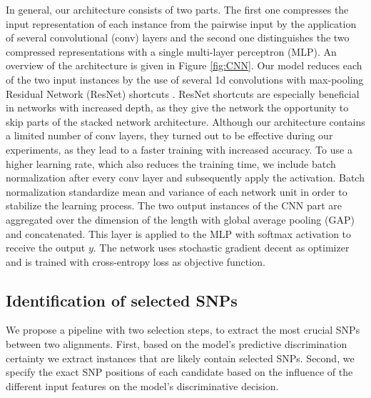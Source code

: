 \documentclass{article}
\begin{document}
In general, our architecture consists of two parts. The first one compresses the input representation of each instance from the pairwise input by the application of several convolutional (conv) layers and the second one distinguishes the two compressed representations with a single multi-layer perceptron (MLP). An overview of the architecture is given in Figure \ref{fig:CNN}.
Our model reduces each of the two input instances by the use of several 1d convolutions with max-pooling Residual Network (ResNet) shortcuts \cite{ResNet}. ResNet shortcuts are especially beneficial in networks with increased depth, as they give the network the opportunity to skip parts of the stacked network architecture. Although our architecture contains a limited number of conv layers, they turned out to be effective during our experiments, as they lead to a faster training with increased accuracy.
To use a higher learning rate, which also reduces the training time, we include batch normalization \cite{batchnorm} after every conv layer and subsequently apply the activation. Batch normalization standardize mean and variance of each network unit in order to stabilize the learning process.
The two output instances of the CNN part are aggregated over the dimension of the length with global average pooling (GAP) and concatenated. This layer is applied to the MLP with softmax activation to receive the output $y$. The network uses stochastic gradient decent as optimizer and is trained with cross-entropy loss as objective function.

\begin{figure*}[t!]
\centering
{}
\caption{Alignment discriminator: The two input alignments are aggregated with several convolutional (conv) layers and Resnet shortcuts. The concatenated GAP of the CNN is applied to a MLP with softmax activation to obtain the final output.}
\label{fig:CNN}
\end{figure*}


\subsection{Identification of selected SNPs}
We propose a pipeline with two selection steps, to extract the most crucial SNPs between two alignments. First, based on the model's predictive discrimination certainty we extract instances that are likely contain selected SNPs. Second, we specify the exact SNP positions of each candidate based on the influence of the different input features on the model's discriminative decision.
\end{document}

